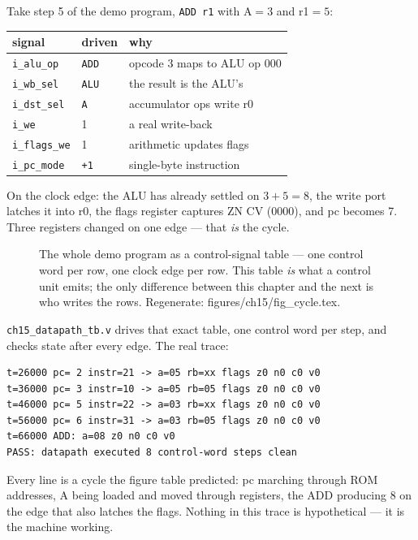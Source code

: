 \begin{example}
Take step 5 of the demo program, \texttt{ADD r1} with A$=3$ and
r1$=5$:

\begin{center}
\begin{tabular}{lll}
\toprule
signal & driven & why\\
\midrule
\texttt{i\_alu\_op} & \texttt{ADD} & opcode 3 maps to ALU op 000\\
\texttt{i\_wb\_sel} & \texttt{ALU} & the result is the ALU's\\
\texttt{i\_dst\_sel} & \texttt{A} & accumulator ops write r0\\
\texttt{i\_we} & 1 & a real write-back\\
\texttt{i\_flags\_we} & 1 & arithmetic updates flags\\
\texttt{i\_pc\_mode} & \texttt{+1} & single-byte instruction\\
\bottomrule
\end{tabular}
\end{center}

On the clock edge: the ALU has already settled on $3+5=8$, the
write port latches it into r0, the flags register captures ZN CV
(0000), and pc becomes 7. Three registers changed on one edge ---
that \emph{is} the cycle.
\end{example}

\begin{figure}[htbp]
\centering

\caption{The whole demo program as a control-signal table --- one
control word per row, one clock edge per row. This table \emph{is}
what a control unit emits; the only difference between this chapter
and the next is who writes the rows. Regenerate: \ttfamily
figures/ch15/fig\_cycle.tex.}
\label{fig:cycle15}
\end{figure}

\begin{example}
\texttt{ch15\_datapath\_tb.v} drives that exact table, one control
word per step, and checks state after every edge. The real trace:

\begin{lstlisting}[caption={Real run of \ttfamily ch15\_datapath\_tb.v.
Watch \texttt{rb=xx} on the first MOV --- an unwritten register reads
\texttt{x}, which is the honest answer.}]
t=26000 pc= 2 instr=21 -> a=05 rb=xx flags z0 n0 c0 v0
t=36000 pc= 3 instr=10 -> a=05 rb=05 flags z0 n0 c0 v0
t=46000 pc= 5 instr=22 -> a=03 rb=xx flags z0 n0 c0 v0
t=56000 pc= 6 instr=31 -> a=03 rb=05 flags z0 n0 c0 v0
t=66000 ADD: a=08 z0 n0 c0 v0
PASS: datapath executed 8 control-word steps clean
\end{lstlisting}

Every line is a cycle the figure table predicted: pc marching through
ROM addresses, A being loaded and moved through registers, the ADD
producing 8 on the edge that also latches the flags. Nothing in this
trace is hypothetical --- it is the machine working.
\end{example}

